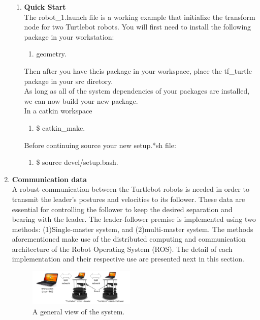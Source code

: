 \documentclass[journal]{IEEEtran}
\begin{document}
\begin{enumerate}
\begin{enumerate}
\item \textbf {Quick Start}\\
The robot{\_}1.launch file is a working example that initialize the transform node for two Turtlebot robots.
You will first need to install the following package in your workstation:
\begin{enumerate}
\item {geometry}\cite{temp10}.

\end{enumerate}

Then after you have theis package in your workspace, place the tf{\_}turtle\cite{temp11} package in your src diretory.\\
As long as all of the system dependencies of your packages are installed, we can now build your new package.\\
In a catkin workspace
\begin{enumerate} 
\item {{\$} catkin{\_}make}.
\end{enumerate}

Before continuing source your new setup.*sh file:
\begin{enumerate}
\item {{\$} source devel/setup.bash}.
\end{enumerate}

\end{enumerate}








\item \textbf {Communication data}\\
A robust communication between the Turtlebot robots is needed in order to transmit the leader’s postures and velocities to its follower. These data are essential for controlling the follower to keep the desired separation and bearing with the leader. The leader-follower premise is implemented using two methods: (1)Single-master system, and (2)multi-master system. The methods aforementioned make use of the distributed computing and communication architecture of the Robot Operating System (ROS). The detail of each implementation and their respective use are presented next in this section. 

\begin{figure}[!h]
\begin{center}
\includegraphics[width=2in]{multi1.png}
\caption{A general view of the system.}
\end{center}
\end{figure}


\end{enumerate}
\end{document}
